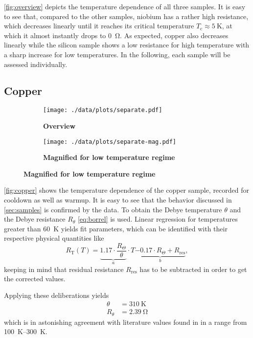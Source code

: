 \autoref{fig:overview} depicts the temperature dependence of all three samples.
It is easy to see that, compared to the other samples, niobium has a rather high resistance, which decreases linearly until it reaches its critical temperature $T_\text{c}\approx\SI{5}{\kelvin}$, at which it almost instantly drops to \SI{0}{\ohm}.
As expected, copper also decreases linearly while the silicon sample shows a low resistance for high temperature with a sharp increase for low temperatures.
In the following, each sample will be assessed individually.

\subsection{Copper}
\begin{figure}
\begin{adjustwidth}{-1cm}{-1cm}
	\centering
	\begin{subfigure}{.55\textwidth}
		\centering
		\texttt{[image: ./data/plots/separate.pdf]}
		\caption{\textbf{Overview}}
	\end{subfigure}
	\hfill
	\begin{subfigure}{.55\textwidth}
		\centering
		\texttt{[image: ./data/plots/separate-mag.pdf]}
		\caption{\textbf{Magnified for low temperature regime}}
	\end{subfigure}
	\label{fig:copper}
\end{adjustwidth}
\end{figure}

\autoref{fig:copper} shows the temperature dependence of the copper sample, recorded for cooldown as well as warmup.
It is easy to see that the behavior discussed in \autoref{sec:samples} is confirmed by the data.
To obtain the Debye temperature $\theta$ and the Debye resistance $R_\theta$ \autoref{eq:borrel} is used.
Linear regression for temperatures greater than \SI{60}{\kelvin} yields fit parameters, which can be identified with their respective physical quantities like
\begin{equation*}
	R_\text{T}(T) = \underbrace{\num{1.17} \cdot \frac{R_\Theta}{\theta}}_a \cdot T \underbrace{- \num{0.17} \cdot R_\Theta + R_\text{res}}_b,
\end{equation*}
keeping in mind that residual resistance $R_\text{res}$ has to be subtracted in order to get the corrected values.

Applying these deliberations yields
\begin{align*}
	\theta &= \SI{310}{\kelvin} \\
	R_\theta &= \SI{2.39}{\ohm}
\end{align*}
which is in astonishing agreement with literature values found in \cite{debyecu} in a range from \SIrange{100}{300}{\kelvin}.

